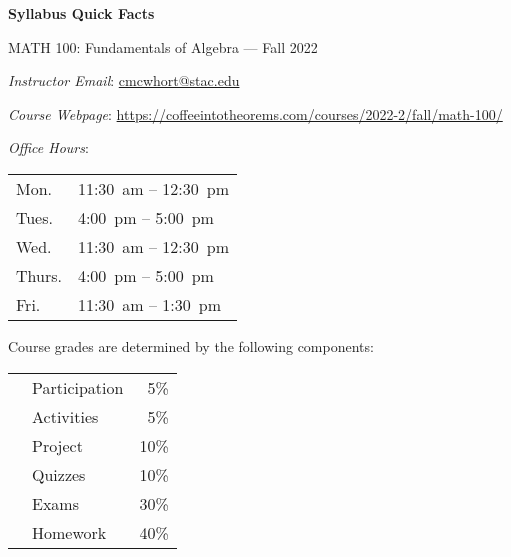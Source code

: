 \documentclass[11pt,letterpaper]{article}
\begin{document}
\begin{center} 
\bfseries
\color{stacred}
\LARGE Syllabus Quick Facts \par\vspace{0.2\baselineskip}
\Large MATH 100: Fundamentals of Algebra --- Fall 2022 
\end{center} \pspace


\hspace{0.53cm} {\itshape Instructor Email}: \href{mailto:cmcwhort@stac.edu}{cmcwhort@stac.edu} \par
\hspace{0.53cm} {\itshape Course Webpage}: \href{https://coffeeintotheorems.com/courses/2022-2/fall/math-100/}{https://coffeeintotheorems.com/courses/2022-2/fall/math-100/} \par
\hspace{0.53cm} {\itshape Office Hours}: 	\par \vspace{-0.3cm}
	\begin{table}[!ht]
	\centering
	\begin{tabular}{l || l}
	Mon. & 11:30~am -- 12:30~pm \\
	Tues. & 4:00~pm -- 5:00~pm \\
	Wed. & 11:30~am -- 12:30~pm \\
	Thurs. & 4:00~pm -- 5:00~pm \\
	Fri. & 11:30~am -- 1:30~pm
	\end{tabular}
	\end{table}


Course grades are determined by the following components: \par \vspace{-0.3cm}
	\begin{table}[!ht]
        \begin{tabular}{clr}
	& Participation & 5\% \\
        & Activities & 5\% \\
	& Project & 10\% \\
	& Quizzes & 10\% \\
	& Exams & 30\% \\
	& Homework & 40\% 
        \end{tabular} 
        \end{table}
\end{document}
